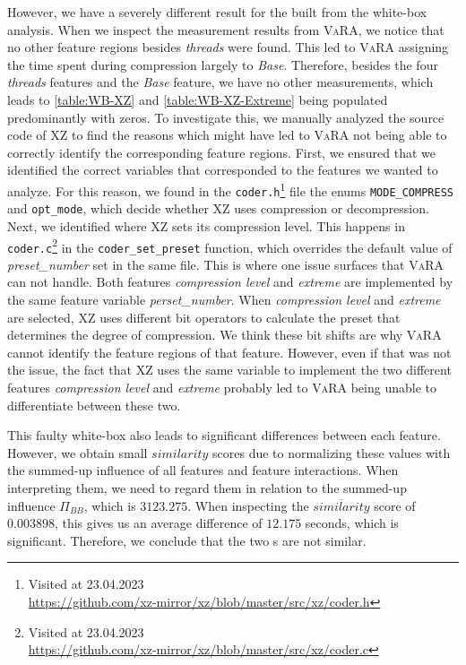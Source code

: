 However, we have a severely different result for the {\perfInfluenceModel} built from the white-box analysis. 
When we inspect the measurement results from \textsc{VaRA}, we notice that no other feature regions besides \emph{threads} were found. 
This led to \textsc{VaRA} assigning the time spent during compression largely to \emph{Base}. 
Therefore, besides the four \emph{threads} features and the \emph{Base} feature, we have no other measurements,  
which leads to \autoref{table:WB-XZ} and \autoref{table:WB-XZ-Extreme} being populated predominantly with zeros.
To investigate this, we manually analyzed the source code of \textsc{XZ} to find the reasons which might have led to 
\textsc{VaRA} not being able to correctly identify the corresponding feature regions.
First, we ensured that we identified the correct variables that corresponded to the features we wanted to analyze. 
For this reason, we found in the \texttt{coder.h}\footnote{Visited at 23.04.2023\\ \url{https://github.com/xz-mirror/xz/blob/master/src/xz/coder.h}}
file the enums \texttt{MODE\_COMPRESS} and \texttt{opt\_mode}, which decide whether \textsc{XZ} uses compression or decompression. 
%
Next, we identified where \textsc{XZ} sets its compression level. 
This happens in \texttt{coder.c}\footnote{Visited at 23.04.2023\\ \url{https://github.com/xz-mirror/xz/blob/master/src/xz/coder.c}} 
in the \texttt{coder\_set\_preset} function, which overrides the default value of \emph{preset\_number} set in the same file. 
This is where one issue surfaces that \textsc{VaRA} can not handle. 
Both features \emph{compression level} and \emph{extreme} are implemented by the same feature variable \emph{perset\_number}. 
When \emph{compression level} and \emph{extreme} are selected, \textsc{XZ} uses different bit operators to calculate the preset that determines 
the degree of compression. We think these bit shifts are why \textsc{VaRA} cannot identify the feature regions of that feature. 
However, even if that was not the issue, the fact that \textsc{XZ} uses the same variable to implement the two different features 
\emph{compression level} and \emph{extreme} probably led to \textsc{VaRA} being unable to differentiate between these two.

This faulty white-box {\perfInfluenceModel} also leads to significant differences between each feature. 
However, we obtain small $similarity$ scores due to normalizing these values with the summed-up influence of all features and feature interactions. 
When interpreting them, we need to regard them in relation to the summed-up influence $\Pi_{BB}$, which is $3123.275$. 
When inspecting the $\overline{similarity}$ score of $0.003898$, this gives us an average difference of $12.175$ seconds, which is significant. 
Therefore, we conclude that the two {\perfInfluenceModel}s are not similar.


